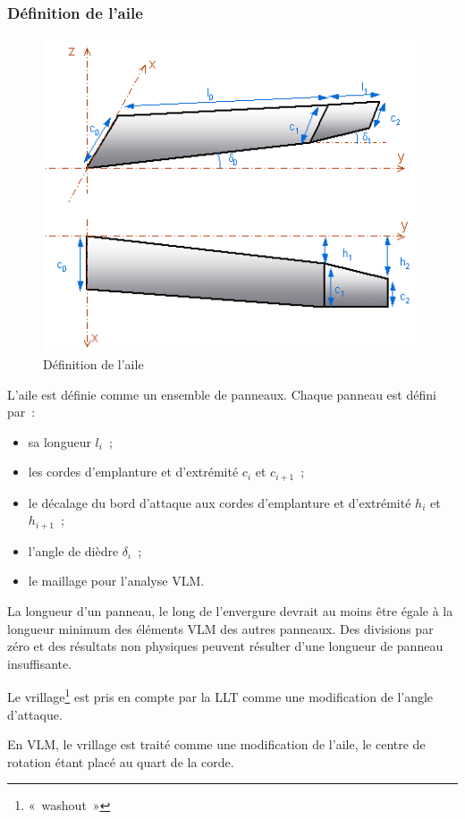 \documentclass[a4paper,twoside,12pt,dvips]{article}
\begin{document}
\subsubsection{Définition de l’aile}

\begin{figure}[!ht] %
	\centering
	\includegraphics[width=0.8\linewidth]{img-07}
	\caption{Définition de l’aile}
	\label{img:définition_aile}
\end{figure}

L’aile est définie comme un ensemble de panneaux. Chaque panneau est défini
par~:
\begin{itemize}
	\item sa longueur $l_i$~;
	\item les cordes d’emplanture et d’extrémité $c_i$ et $c_{i+1}$~;
	\item le décalage du bord d’attaque aux cordes d’emplanture et d’extrémité
	$h_i$ et $h_{i+1}$~;
	\item l’angle de dièdre $ \delta_\iota$~;
	\item le maillage pour l’analyse VLM.
\end{itemize}

La longueur d’un panneau, le long de l’envergure devrait au moins être égale à la longueur minimum des éléments VLM des autres panneaux. Des divisions par zéro et des résultats non physiques peuvent résulter d’une longueur de panneau
insuffisante. 

Le vrillage\footnote{«~washout~»} est pris en compte par la  LLT comme une modification de l'angle d’attaque. 

En VLM, le vrillage est traité comme une modification de l’aile, le centre de
rotation étant placé au quart de la corde. 
\end{document}
